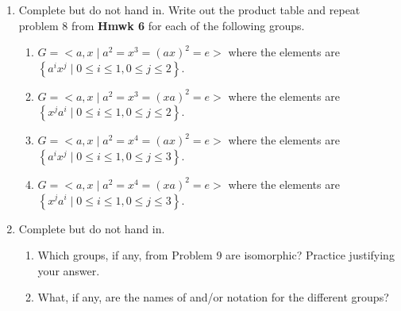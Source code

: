\begin{enumerate}
\begin{enumerate}
\begin{subprove}
      Since $\phi$ is a bijection and preserves the group operation,
      it is concluded by definition of  that $(G, *)$ and $(G, \circ)$ are isomorphic.
    \end{subprove}
  \end{enumerate}







  \newpage

  \item Complete but do not hand in. Write out the product table and repeat problem 8 from \textbf{Hmwk 6} for each of the following groups.
  \begin{enumerate}
    \item $G=<a, x \mid a^{2}=x^{3}=(a x)^{2}=e>$ where the elements are $\left\{a^{i} x^{j} \mid 0 \leq i \leq 1,0 \leq j \leq 2\right\}$.
    \begin{subanswer}
      
    \end{subanswer}
    \item $G=<a, x \mid a^{2}=x^{3}=(x a)^{2}=e>$ where the elements are $\left\{x^{j} a^{i} \mid 0 \leq i \leq 1,0 \leq j \leq 2\right\}$.
    \begin{subanswer}
      
    \end{subanswer}
    \item $G=<a, x \mid a^{2}=x^{4}=(a x)^{2}=e>$ where the elements are $\left\{a^{i} x^{j} \mid 0 \leq i \leq 1,0 \leq j \leq 3\right\}$.
    \begin{subanswer}
      
    \end{subanswer}
    \item $G=<a, x \mid a^{2}=x^{4}=(x a)^{2}=e>$ where the elements are $\left\{x^{j} a^{i} \mid 0 \leq i \leq 1,0 \leq j \leq 3\right\}$.
    \begin{subanswer}
      
    \end{subanswer}
  \end{enumerate}
  \item Complete but do not hand in.
  \begin{enumerate}
    \item Which groups, if any, from Problem 9 are isomorphic? Practice justifying your answer.
    \begin{subanswer}
      
    \end{subanswer}
    \item What, if any, are the names of and/or notation for the different groups?
    \begin{subanswer}
      

\end{subanswer}
\end{enumerate}
\end{enumerate}
